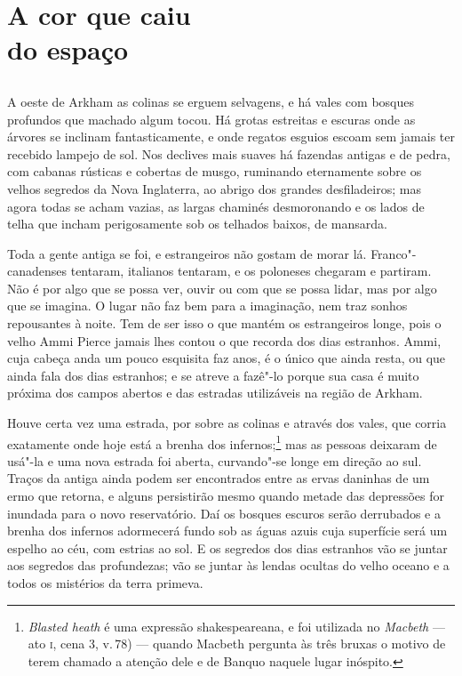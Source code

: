 \baselineskip

\part[A cor que caiu do espaço]{A cor que caiu\\do espaço}

\chapter*{}
A oeste de Arkham as colinas se erguem selvagens, e há vales com bosques
profundos que machado algum tocou. Há grotas estreitas e escuras onde as
árvores se inclinam fantasticamente, e onde regatos esguios escoam sem
jamais ter recebido lampejo de sol. Nos declives mais suaves há fazendas
antigas e de pedra, com cabanas rústicas e cobertas de musgo, ruminando
eternamente sobre os velhos segredos da Nova Inglaterra, ao abrigo dos
grandes desfiladeiros; mas agora todas se acham vazias, as largas
chaminés desmoronando e os lados de telha que incham perigosamente sob
os telhados baixos, de mansarda.

Toda a gente antiga se foi, e estrangeiros não gostam de morar lá.
Franco"-canadenses tentaram, italianos tentaram, e os poloneses chegaram
e partiram. Não é por algo que se possa ver, ouvir ou com que se possa
lidar, mas por algo que se imagina. O lugar não faz bem para a
imaginação, nem traz sonhos repousantes à noite. Tem de ser isso o que
mantém os estrangeiros longe, pois o velho Ammi Pierce jamais lhes
contou o que recorda dos dias estranhos. Ammi, cuja cabeça anda um pouco
esquisita faz anos, é o único que ainda resta, ou que ainda fala dos
dias estranhos; e se atreve a fazê"-lo porque sua casa é muito próxima
dos campos abertos e das estradas utilizáveis na região de Arkham.

Houve certa vez uma estrada, por sobre as colinas e através dos vales,
que corria exatamente onde hoje está a brenha dos infernos;\footnote{\textit{Blasted
  heath} é uma expressão shakespeareana, e foi utilizada no
  \textit{Macbeth} --- ato \textsc{i}, cena 3, v.\,78) --- quando Macbeth pergunta às três
  bruxas o motivo de terem chamado a atenção dele e de Banquo naquele
  lugar inóspito.} mas as pessoas deixaram de usá"-la e uma nova estrada
foi aberta, curvando"-se longe em direção ao sul. Traços da antiga ainda
podem ser encontrados entre as ervas daninhas de um ermo que retorna, e
alguns persistirão mesmo quando metade das depressões for inundada para
o novo reservatório. Daí os bosques escuros serão derrubados e a brenha
dos infernos adormecerá fundo sob as águas azuis cuja superfície será um
espelho ao céu, com estrias ao sol. E os segredos dos dias estranhos vão
se juntar aos segredos das profundezas; vão se juntar às lendas ocultas
do velho oceano e a todos os mistérios da terra primeva.


